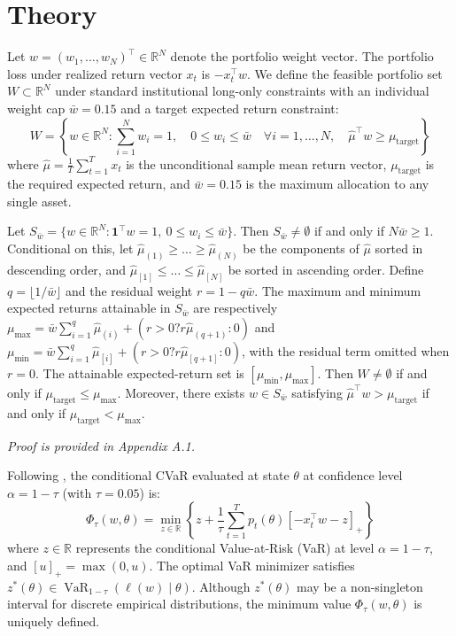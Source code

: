 \documentclass[smallextended]{svjour3}
\begin{document}
\section{Theory}
Let $w = (w_1, \dots, w_N)^\top \in \mathbb{R}^N$ denote the portfolio weight vector. The portfolio loss under realized return vector $x_t$ is $-x_t^\top w$. We define the feasible portfolio set $W \subset \mathbb{R}^N$ under standard institutional long-only constraints with an individual weight cap $\bar{w} = 0.15$ and a target expected return constraint:
\begin{equation}
    W = \left\{ w \in \mathbb{R}^N : \sum_{i=1}^N w_i = 1, \quad 0 \le w_i \le \bar{w} \quad \forall i=1,\dots,N, \quad \hat{\mu}^\top w \ge \mu_{\text{target}} \right\}
\end{equation}
where $\hat{\mu} = \frac{1}{T} \sum_{t=1}^T x_t$ is the unconditional sample mean return vector, $\mu_{\text{target}}$ is the required expected return, and $\bar{w} = 0.15$ is the maximum allocation to any single asset.

\begin{proposition}
Let $S_{\bar w}=\{w \in \mathbb{R}^N : \mathbf{1}^\top w=1,\ 0\leq w_i\leq\bar w\}$. Then $S_{\bar w}\neq\emptyset$ if and only if $N\bar w\geq 1$. Conditional on this, let $\hat{\mu}_{(1)} \ge \dots \ge \hat{\mu}_{(N)}$ be the components of $\hat{\mu}$ sorted in descending order, and $\hat{\mu}_{[1]} \le \dots \le \hat{\mu}_{[N]}$ be sorted in ascending order. Define $q = \lfloor 1/\bar{w} \rfloor$ and the residual weight $r = 1 - q \bar{w}$. The maximum and minimum expected returns attainable in $S_{\bar w}$ are respectively $\mu_{\max} = \bar{w} \sum_{i=1}^q \hat{\mu}_{(i)} + (r > 0 ? r \hat{\mu}_{(q+1)} : 0)$ and $\mu_{\min} = \bar{w} \sum_{i=1}^q \hat{\mu}_{[i]} + (r > 0 ? r \hat{\mu}_{[q+1]} : 0)$, with the residual term omitted when $r=0$. The attainable expected-return set is $[\mu_{\min}, \mu_{\max}]$. Then $W\neq\emptyset$ if and only if $\mu_{\mathrm{target}}\leq\mu_{\max}$. Moreover, there exists $w\in S_{\bar w}$ satisfying $\hat\mu^\top w>\mu_{\mathrm{target}}$ if and only if $\mu_{\mathrm{target}}<\mu_{\max}$.
\end{proposition}

\textit{Proof is provided in Appendix A.1.}


Following \citet{rockafellar2000optimization}, the conditional CVaR evaluated at state $\theta$ at confidence level $\alpha = 1 - \tau$ (with $\tau = 0.05$) is:
\begin{equation}
    \Phi_\tau(w, \theta) = \min_{z \in \mathbb{R}} \left\{ z + \frac{1}{\tau} \sum_{t=1}^T p_t(\theta) [-x_t^\top w - z]_+ \right\}
\end{equation}
where $z \in \mathbb{R}$ represents the conditional Value-at-Risk (VaR) at level $\alpha = 1 - \tau$, and $[u]_+ = \max(0, u)$. The optimal VaR minimizer satisfies $z^*(\theta) \in \operatorname{VaR}_{1-\tau}(\ell(w) \mid \theta)$. Although $z^*(\theta)$ may be a non-singleton interval for discrete empirical distributions, the minimum value $\Phi_\tau(w, \theta)$ is uniquely defined.
\end{document}
